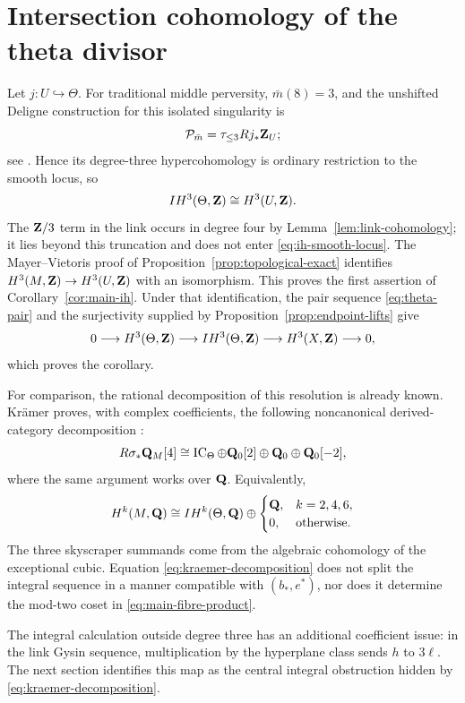 \section{Intersection cohomology of the theta divisor}\label{sec:intersection}

Let \(j:U\hookrightarrow\Theta\).  For traditional middle perversity,
\(\bar m(8)=3\), and the unshifted Deligne construction for this isolated
singularity is
\[
 \mathcal P_{\bar m}=\tau_{\leq3}Rj_*\mathbf Z_U;
\]
see \cite[Section~3.1 and Theorem~3.5]{GoreskyMacPhersonIHII}.  Hence its
degree-three hypercohomology is ordinary restriction to the smooth locus,
so
\begin{equation}\label{eq:ih-smooth-locus}
 IH^3(\Theta,\mathbf Z)\cong H^3(U,\mathbf Z).
\end{equation}
The \(\mathbf Z/3\) term in the link occurs in degree four by
Lemma~\ref{lem:link-cohomology}; it lies beyond this truncation and does not
enter \eqref{eq:ih-smooth-locus}.
The Mayer--Vietoris proof of Proposition~\ref{prop:topological-exact}
identifies \(H^3(M,\mathbf Z)\to H^3(U,\mathbf Z)\) with an isomorphism.  This proves the
first assertion of Corollary~\ref{cor:main-ih}.  Under that identification,
the pair sequence \eqref{eq:theta-pair} and the surjectivity supplied by
Proposition~\ref{prop:endpoint-lifts} give
\[
 0\longrightarrow H^3(\Theta,\mathbf Z)
 \longrightarrow IH^3(\Theta,\mathbf Z)
 \longrightarrow H^3(X,\mathbf Z)\longrightarrow0,
\]
which proves the corollary.

For comparison, the rational decomposition of this resolution is already
known.  Krämer proves, with complex coefficients, the following noncanonical
derived-category decomposition \cite[Corollary~6]{KraemerE6}:
\begin{equation}\label{eq:kraemer-decomposition}
 R\sigma_*\mathbf Q_M[4]
 \cong\operatorname{IC}_\Theta\oplus\mathbf Q_0[2]\oplus\mathbf Q_0\oplus\mathbf Q_0[-2],
\end{equation}
where the same argument works over \(\mathbf Q\).  Equivalently,
\[
 H^k(M,\mathbf Q)\cong IH^k(\Theta,\mathbf Q)\oplus
 \begin{cases}
  \mathbf Q,&k=2,4,6,\\
  0,&\text{otherwise}.
 \end{cases}
\]
The three skyscraper summands come from the algebraic cohomology of the
exceptional cubic.  Equation \eqref{eq:kraemer-decomposition} does not split
the integral sequence in a manner compatible with \((b_*,e^*)\), nor does
it determine the mod-two coset in \eqref{eq:main-fibre-product}.

The integral calculation outside degree three has an additional coefficient
issue: in the link Gysin sequence, multiplication by the hyperplane class
sends \(h\) to \(3\ell\).  The next section identifies this map as the
central integral obstruction hidden by \eqref{eq:kraemer-decomposition}.
